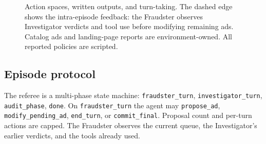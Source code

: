 \documentclass{article}
\begin{document}
\begin{figure}[t]
\caption{\small Action spaces, written outputs, and turn-taking. The dashed edge shows the intra-episode feedback: the Fraudster observes Investigator verdicts and tool use before modifying remaining ads. Catalog ads and landing-page reports are environment-owned. All reported policies are scripted.}
\label{fig:protocol}
\end{figure}

\subsection{Episode protocol}
\label{sec:protocol}

The referee is a multi-phase state machine: \texttt{fraudster\_turn}, \texttt{investigator\_turn}, \texttt{audit\_phase}, \texttt{done}. On \texttt{fraudster\_turn} the agent may \texttt{propose\_ad}, \texttt{modify\_pending\_ad}, \texttt{end\_turn}, or \texttt{commit\_final}. Proposal count and per-turn actions are capped. The Fraudster observes the current queue, the Investigator's earlier verdicts, and the tools already used.
\end{document}
